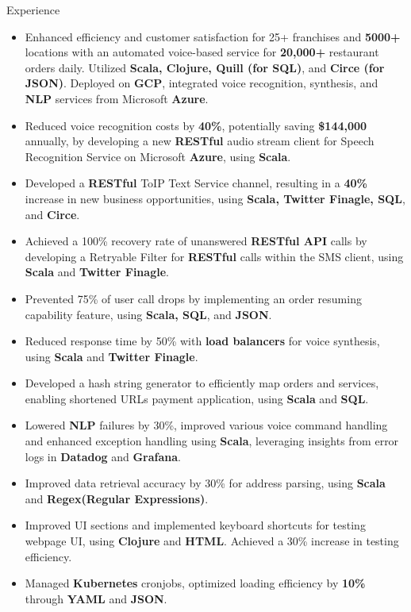 \documentclass{resume} %
\begin{document}
\begin{workSection}{Experience}
      \experienceItem[
      company=Novo Labs Inc,
      location=Dallas{,} TX,
      position=Software Engineer,
      duration=Feb. 2021 – June 2023
      ]
      \vspace{-0.65em}
      \begin{itemize}
            \itemsep -6pt {}
            \item Enhanced efficiency and customer satisfaction for 25+ franchises and \textbf{5000+} locations with an automated voice-based service for \textbf{20,000+} restaurant orders daily. Utilized \textbf{Scala, Clojure, Quill (for SQL)}, and \textbf{Circe (for JSON)}. Deployed on \textbf{GCP}, integrated voice recognition, synthesis, and \textbf{NLP} services from Microsoft \textbf{Azure}.
            \item Reduced voice recognition costs by \textbf{40\%}, potentially saving \textbf{\$144,000} annually, by developing a new \textbf{RESTful} audio stream client for Speech Recognition Service on Microsoft \textbf{Azure}, using \textbf{Scala}.
            \item Developed a \textbf{RESTful} ToIP Text Service channel, resulting in a \textbf{40\%} increase in new business opportunities, using \textbf{Scala, Twitter Finagle, SQL}, and \textbf{Circe}.
            \item Achieved a 100\% recovery rate of unanswered \textbf{RESTful API} calls by developing a Retryable Filter for \textbf{RESTful} calls within the SMS client, using \textbf{Scala} and \textbf{Twitter Finagle}.
            \item Prevented 75\% of user call drops by implementing an order resuming capability feature, using \textbf{Scala, SQL}, and \textbf{JSON}.
            \item Reduced response time by 50\% with \textbf{load balancers} for voice synthesis, using \textbf{Scala} and \textbf{Twitter Finagle}.
            \item Developed a hash string generator to efficiently map orders and services, enabling shortened URLs payment application, using \textbf{Scala} and \textbf{SQL}.
            \item Lowered \textbf{NLP} failures by 30\%, improved various voice command handling and enhanced exception handling using \textbf{Scala}, leveraging insights from error logs in \textbf{Datadog} and \textbf{Grafana}.
            \item Improved data retrieval accuracy by 30\% for address parsing, using \textbf{Scala} and \textbf{Regex(Regular Expressions)}.
            \item Improved UI sections and implemented keyboard shortcuts for testing webpage UI, using \textbf{Clojure} and \textbf{HTML}. Achieved a 30\% increase in testing efficiency.
            \item Managed \textbf{Kubernetes} cronjobs, optimized loading efficiency by \textbf{10\%} through \textbf{YAML} and \textbf{JSON}.
      \end{itemize}


\end{workSection}
\end{document}
